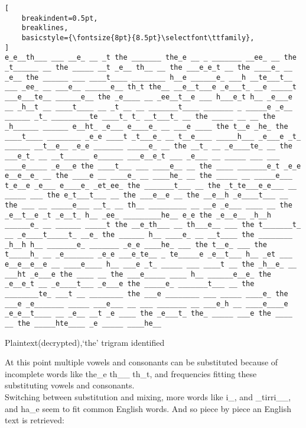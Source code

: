 \documentclass{uva-inf-bachelor-thesis}
\begin{document}
\begin{lstlisting}[
    breakindent=0.5pt,
    breaklines,
    basicstyle={\fontsize{8pt}{8.5pt}\selectfont\ttfamily},
]
e_e__th___ ___ __e_ __ _t the _______ the_e __ _ _______ __ee_ __ the _t______ __ the _____ __t _e__ th__ __ the ___e_e_t __ the ____e_ __ _e__ the ______ ___ ____t____ ________ h__e ______e_ ___h __te___t__ ___ _ee_ __ ___e__ ______e__ th_t the__ __e__t___e _e___t_ __e _____t ___e___te__ ______e__ the _e____ __ _ee__t__e ___ h___e_t h__ _e___e __ _h__t __ ____t____ __ _t __ __ _______t____ _______ _ _____e _e__ ______ _t_ _________te ____t_ t_ __t___t_ __ the _____ __ __ the _h______ ______ e__ht_ _e___ e____e_ __ ___e ____ the t__e _he_ the ____t____ ________ _e_e ____t _t___e_ __ t__e____ _____h___ _e___e _t_ ______ __t__e__ _e_e _______ _____e_ __ the __t_ __ _e____te_ __ the ___e_t_ __ __t______ e______ ___e__e_t ___ _e___ __ _____ ___ ___ ____e_____ _e___e the ____t___ ___ ____e__ __ the ____ _______e_t _e_e e__e__e_ __ the ____e __ ____e_ __ ____he_ __ the _____ __ _____e___ t_e__e _e___ e____e_ _et_ee_ the _______t___ __ the _t_te___e_e___ __ _____ ___ the e_t___t___ __ the ___e__e __ the __e__h _e____t___ __ the ___ __ _____e___ __t_ __ th__ _________ __ __e _e___ ____ __ the _e__t__e _t _e__t_ h__ _ee_ _________he__ e_e the _e__e__ _h__h ______e_ __ ______ _____t the __e_th___ __ th___e__ ___ the t_______t_ __ _e____t_____t_ __e_ the ______ h__ ____e_ __ __t____ the ________ _h__h h__ _______e_ _______ _e_e ____he_ ___ the t__e_ ___ the t_____h_ __ _e_______ _e_e ___e_te__ _ te_____e _e__t___ h__ _et ___ e__e__e__e __ ____e____ h__ ___e _t_ _____ ___ ____t __ the _h__e_ __ ___ht _e___e the ____ __ the ___e_____ ____ h__ ______e__e_ the _e__e_t __ _e____t___ _e___e the _____e_ _______t___ __ the ________te_ ___t __ ________ the ___e ________ ___ _____ ____e_ the ___e _e_______ _____ ___e___ __ ___ _______ __ ___e_h __ ____e____e _e_e__t____ __ _e__ __t _e ____ the _e___t_ the_ _____ ___e the ____ __ the _____hte____ _e _____ ____he__
\end{lstlisting}
\caption[lstlisting]{Plaintext(decrypted),`the' trigram identified}
\vspace{20pt}
At this point multiple vowels and consonants can be substituted because of
incomplete words like the\_e th\_\_ th\_t, and frequencies fitting these
substituting vowels and consonants.\\

Switching between substitution and mixing, more words like i\_, and
\_tirri\_\_, and ha\_e seem to fit common English words.
And so piece by piece an English text is retrieved:
\end{document}
